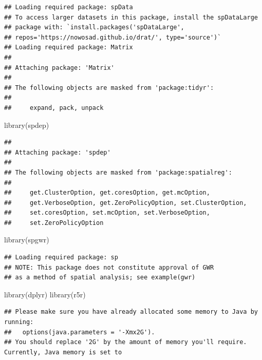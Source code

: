 \documentclass[
]{article}
\newenvironment{Shaded}{\begin{snugshade}}{\end{snugshade}}
\newcommand{\FunctionTok}[1]{\textcolor[rgb]{0.00,0.00,0.00}{#1}}
\newcommand{\NormalTok}[1]{#1}
\begin{document}
\begin{verbatim}
## Loading required package: spData
## To access larger datasets in this package, install the spDataLarge
## package with: `install.packages('spDataLarge',
## repos='https://nowosad.github.io/drat/', type='source')`
## Loading required package: Matrix
## 
## Attaching package: 'Matrix'
## 
## The following objects are masked from 'package:tidyr':
## 
##     expand, pack, unpack
\end{verbatim}

\begin{Shaded}
\begin{Highlighting}[]
\FunctionTok{library}\NormalTok{(spdep)}
\end{Highlighting}
\end{Shaded}

\begin{verbatim}
## 
## Attaching package: 'spdep'
## 
## The following objects are masked from 'package:spatialreg':
## 
##     get.ClusterOption, get.coresOption, get.mcOption,
##     get.VerboseOption, get.ZeroPolicyOption, set.ClusterOption,
##     set.coresOption, set.mcOption, set.VerboseOption,
##     set.ZeroPolicyOption
\end{verbatim}

\begin{Shaded}
\begin{Highlighting}[]
\FunctionTok{library}\NormalTok{(spgwr)}
\end{Highlighting}
\end{Shaded}

\begin{verbatim}
## Loading required package: sp
## NOTE: This package does not constitute approval of GWR
## as a method of spatial analysis; see example(gwr)
\end{verbatim}

\begin{Shaded}
\begin{Highlighting}[]
\FunctionTok{library}\NormalTok{(dplyr)}
\FunctionTok{library}\NormalTok{(r5r)}
\end{Highlighting}
\end{Shaded}

\begin{verbatim}
## Please make sure you have already allocated some memory to Java by running:
##   options(java.parameters = '-Xmx2G').
## You should replace '2G' by the amount of memory you'll require. Currently, Java memory is set to
\end{verbatim}
\end{document}
